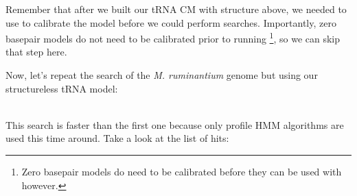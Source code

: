 Remember that after we built our tRNA CM with structure above, we
needed to use  to calibrate the model before we
could perform searches. Importantly, zero basepair models do not need
to be calibrated prior to running \footnote{Zero
  basepair models do need to be calibrated before they can be used
  with  however.}, so we can skip that step here. 

Now, let's repeat the search of the \emph{M. ruminantium} genome but
using our structureless tRNA model: 

\\

This search is faster than the first one because only profile HMM
algorithms are used this time around. Take a look at the list of hits:

